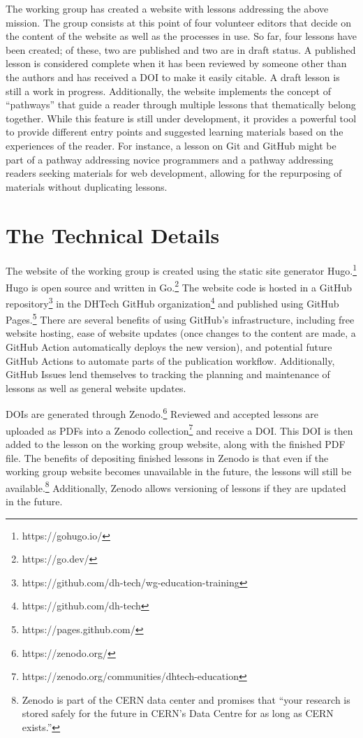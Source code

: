 \documentclass[final]{anthology-ch} %
\begin{document}
The working group has created a website with lessons addressing the above mission. The group consists at this point of four volunteer editors that decide on the content of the website as well as the processes in use. So far, four lessons have been created; of these, two are published and two are in draft status. A published lesson is considered complete when it has been reviewed by someone other than the authors and has received a DOI to make it easily citable. A draft lesson is still a work in progress. Additionally, the website implements the concept of “pathways” that guide a reader through multiple lessons that thematically belong together. While this feature is still under development, it provides a powerful tool to provide different entry points and suggested learning materials based on the experiences of the reader. For instance, a lesson on Git and GitHub might be part of a pathway addressing novice programmers and a pathway addressing readers seeking materials for web development, allowing for the repurposing of materials without duplicating lessons. 


\section{The Technical Details}

The website of the working group is created using the static site generator Hugo.\footnote{https://gohugo.io/
} Hugo is open source and written in Go.\footnote{https://go.dev/
} The website code is hosted in a GitHub repository\footnote{https://github.com/dh-tech/wg-education-training} in the DHTech GitHub organization\footnote{https://github.com/dh-tech} and published using GitHub Pages.\footnote{https://pages.github.com/
} There are several benefits of using GitHub’s infrastructure, including free website hosting, ease of website updates (once changes to the content are made, a GitHub Action automatically deploys the new version), and potential future GitHub Actions to automate parts of the publication workflow. Additionally, GitHub Issues lend themselves to tracking the planning and maintenance of lessons as well as general website updates.

DOIs are generated through Zenodo.\footnote{https://zenodo.org/
} Reviewed and accepted lessons are uploaded as PDFs into a Zenodo collection\footnote{https://zenodo.org/communities/dhtech-education
} and receive a DOI. This DOI is then added to the lesson on the working group website, along with the finished PDF file. The benefits of depositing finished lessons in Zenodo is that even if the working group website becomes unavailable in the future, the lessons will still be available.\footnote{Zenodo is part of the CERN data center and promises that “your research is stored safely for the future in CERN’s Data Centre for as long as CERN exists.”
} Additionally, Zenodo allows versioning of lessons if they are updated in the future.
\end{document}
